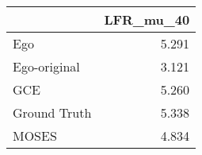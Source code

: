 \begin{tabular}{lr}
\toprule
{} & LFR_mu_40 \\
\midrule
Ego          &     5.291 \\
Ego-original &     3.121 \\
GCE          &     5.260 \\
Ground Truth &     5.338 \\
MOSES        &     4.834 \\
\bottomrule
\end{tabular}
